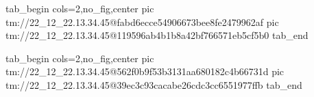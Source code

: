  
 
 
 
 

\qqSecCmtScr


\ifcmt
  tab_begin cols=2,no_fig,center
    pic tm://22_12_22.13.34.45@fabd6ecce54906673bee8fe2479962af
    pic tm://22_12_22.13.34.45@119596ab4b1b8a42bf766571eb5cf5b0
  tab_end
\fi


\ifcmt
  tab_begin cols=2,no_fig,center
    pic tm://22_12_22.13.34.45@562f0b9f53b3131aa680182c4b66731d
    pic tm://22_12_22.13.34.45@39ec3c93cacabe26cdc3cc6551977ffb
  tab_end
\fi

